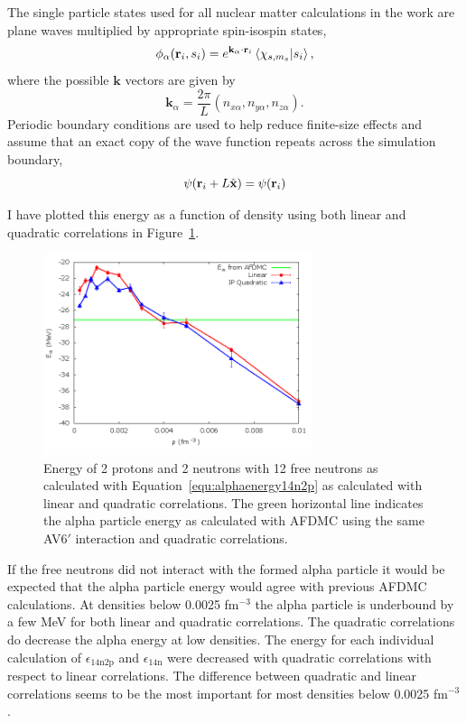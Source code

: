 The single particle states used for all nuclear matter calculations in the work are plane waves multiplied by appropriate spin-isospin states,
\begin{equation}
   \phi_\alpha(\mathbf{r}_i,s_i) = e^{\mathbf{k}_\alpha\cdot\mathbf{r}_i}\left< \chi_{s,m_s} | s_i \right>,
\end{equation}
where the possible $\mathbf{k}$ vectors are given by
\begin{equation}
   \mathbf{k}_\alpha = \frac{2\pi}{L}(n_{x\alpha},n_{y\alpha},n_{z\alpha}).
\end{equation}
Periodic boundary conditions are used to help reduce finite-size effects and assume that an exact copy of the wave function repeats across the simulation boundary,
\begin{equation}
   \psi(\mathbf{r}_i+L\hat{\mathbf{x}}) = \psi(\mathbf{r}_i)
\end{equation}

I have plotted this energy as a function of density using both linear and quadratic correlations in Figure~\ref{fig:alpha}.
\begin{figure}[h!]
   \centering
   \includegraphics[width=0.7\textwidth]{figures/alpha.png}
   \caption{Energy of 2 protons and 2 neutrons with 12 free neutrons as calculated with Equation~\ref{equ:alphaenergy14n2p} as calculated with linear and quadratic correlations. The green horizontal line indicates the alpha particle energy as calculated with AFDMC using the same AV6$'$ interaction and quadratic correlations.}
   \label{fig:alpha}
\end{figure}
If the free neutrons did not interact with the formed alpha particle it would be expected that the alpha particle energy would agree with previous AFDMC calculations. At densities below 0.0025 fm$^{-3}$ the alpha particle is underbound by a few MeV for both linear and quadratic correlations. The quadratic correlations do decrease the alpha energy at low densities. The energy for each individual calculation of $\epsilon_\text{14n2p}$ and $\epsilon_\text{14n}$ were decreased with quadratic correlations with respect to linear correlations. The difference between quadratic and linear correlations seems to be the most important for most densities below 0.0025 fm$^{-3}$.

